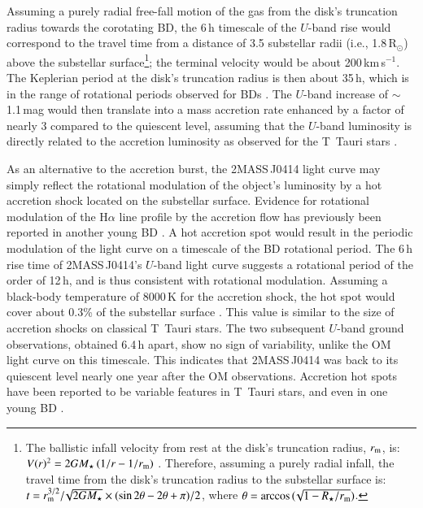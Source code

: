 \documentclass{aa}
\begin{document}
Assuming a purely radial free-fall motion of the gas from the disk's truncation
radius towards the corotating BD, the 6\,h timescale of the $U$-band
rise would correspond to the travel time from a distance of 3.5 substellar
radii (i.e., 1.8\,R$_\odot$) above the substellar
surface\footnote{The
ballistic infall velocity from rest at the disk's truncation radius,
$r_{\rm m}$, is: $V(r)^2=2 G M_\star \,(1/r-1/r_{\rm m})$
\citep[e.g.,][]{hartmann94}. Therefore, assuming a purely radial
infall, the travel time from the disk's truncation radius to the
substellar surface is: $t=r_{\rm
m}^{3/2}/\!\sqrt{2GM_\star}\times(\sin{2\theta}-2\theta+\pi)/2$, where
$\theta=\arccos{(\!\sqrt{1-R_\star/r_{\rm m}})}$.}; 
the terminal velocity would be about 200\,km\,s$^{-1}$. The Keplerian
period at the disk's truncation radius is then about 35\,h, which is
in the range of rotational periods observed for BDs
\citep[4--110\,h][]{scholz05b,zapatero06}.
The $U$-band increase of $\sim$1.1\,mag would then translate into a
mass accretion rate enhanced by a factor of nearly 3 compared to the
quiescent level, assuming that the $U$-band luminosity is directly
related to the accretion luminosity as observed for the T~Tauri stars \citep{gullbring98}.

As an alternative to the accretion burst, the 2MASS\,J0414 light curve
may simply reflect the rotational modulation of the object's luminosity by a hot
accretion shock located on the substellar surface. Evidence for
rotational modulation of the H$\alpha$ line profile by the accretion
flow has previously been reported in another young BD
\citep{scholz05a}. A hot accretion spot would result in the periodic
modulation of the light curve on a timescale of the BD rotational
period. 
The 6\,h rise time of 2MASS\,J0414's
$U$-band light curve suggests a rotational period of the order of 12\,h,
and is thus consistent with rotational modulation.  Assuming a
black-body temperature of 8000\,K for the accretion shock, the hot
spot would cover about 0.3\% of the substellar surface
\citep[e.g.,][]{bouvier93}. This value is similar to the size of
accretion shocks on classical T~Tauri stars.
The two subsequent $U$-band ground observations, obtained 6.4\,h
apart, show no sign of variability, unlike the OM light curve on this
timescale. This indicates that 2MASS\,J0414 was back to its quiescent
level nearly one year after the OM observations. Accretion hot spots
have been reported to be variable features in T~Tauri stars, and even
in one young BD \citep[see][ and references therein]{scholz05a}.
\end{document}
